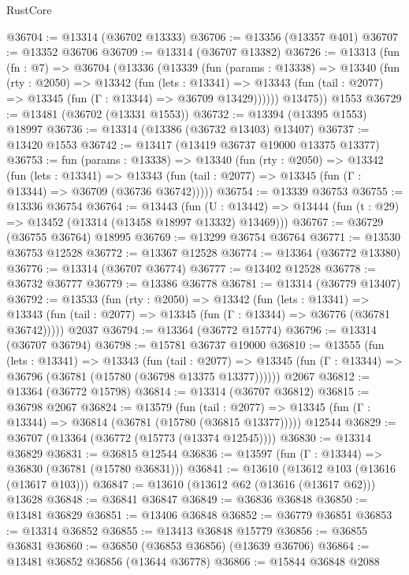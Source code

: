 \begin{lexlean}{RustCore}
\begin{coremodule}
@36704 := @13314 (@36702 @13333)
@36706 := @13356 (@13357 @401)
@36707 := @13352 @36706
@36709 := @13314 (@36707 @13382)
@36726 := @13313
    (fun (fn : @7) =>
    @36704
      (@13336
        (@13339
          (fun (params : @13338) =>
          @13340
            (fun (rty : @2050) =>
            @13342
              (fun (lets : @13341) =>
              @13343 (fun (tail : @2077) => @13345 (fun (Γ : @13344) => @36709 @13429))))))
        @13475))
    @1553
@36729 := @13481 (@36702 (@13331 @1553))
@36732 := @13394 (@13395 @1553) @18997
@36736 := @13314 (@13386 (@36732 @13403) @13407)
@36737 := @13420 @1553
@36742 := @13417 (@13419 @36737 @19000 @13375 @13377)
@36753 := fun (params : @13338) =>
  @13340
    (fun (rty : @2050) =>
    @13342
      (fun (lets : @13341) =>
      @13343 (fun (tail : @2077) => @13345 (fun (Γ : @13344) => @36709 (@36736 @36742)))))
@36754 := @13339 @36753
@36755 := @13336 @36754
@36764 := @13443
    (fun (U : @13442) => @13444 (fun (t : @29) => @13452 (@13314 (@13458 @18997 @13332) @13469)))
@36767 := @36729 (@36755 @36764) @18995
@36769 := @13299 @36754 @36764
@36771 := @13530 @36753 @12528
@36772 := @13367 @12528
@36774 := @13364 (@36772 @13380)
@36776 := @13314 (@36707 @36774)
@36777 := @13402 @12528
@36778 := @36732 @36777
@36779 := @13386 @36778
@36781 := @13314 (@36779 @13407)
@36792 := @13533
    (fun (rty : @2050) =>
    @13342
      (fun (lets : @13341) =>
      @13343 (fun (tail : @2077) => @13345 (fun (Γ : @13344) => @36776 (@36781 @36742)))))
    @2037
@36794 := @13364 (@36772 @15774)
@36796 := @13314 (@36707 @36794)
@36798 := @15781 @36737 @19000
@36810 := @13555
    (fun (lets : @13341) =>
    @13343
      (fun (tail : @2077) =>
      @13345 (fun (Γ : @13344) => @36796 (@36781 (@15780 (@36798 @13375 @13377))))))
    @2067
@36812 := @13364 (@36772 @15798)
@36814 := @13314 (@36707 @36812)
@36815 := @36798 @2067
@36824 := @13579
    (fun (tail : @2077) => @13345 (fun (Γ : @13344) => @36814 (@36781 (@15780 (@36815 @13377)))))
    @12544
@36829 := @36707 (@13364 (@36772 (@15773 (@13374 @12545))))
@36830 := @13314 @36829
@36831 := @36815 @12544
@36836 := @13597 (fun (Γ : @13344) => @36830 (@36781 (@15780 @36831)))
@36841 := @13610 (@13612 @103 (@13616 (@13617 @103)))
@36847 := @13610 (@13612 @62 (@13616 (@13617 @62))) @13628
@36848 := @36841 @36847
@36849 := @36836 @36848
@36850 := @13481 @36829
@36851 := @13406 @36848
@36852 := @36779 @36851
@36853 := @13314 @36852
@36855 := @13413 @36848 @15779
@36856 := @36855 @36831
@36860 := @36850 (@36853 @36856) (@13639 @36706)
@36864 := @13481 @36852 @36856 (@13644 @36778)
@36866 := @15844 @36848 @2088

\end{coremodule}
\end{lexlean}
